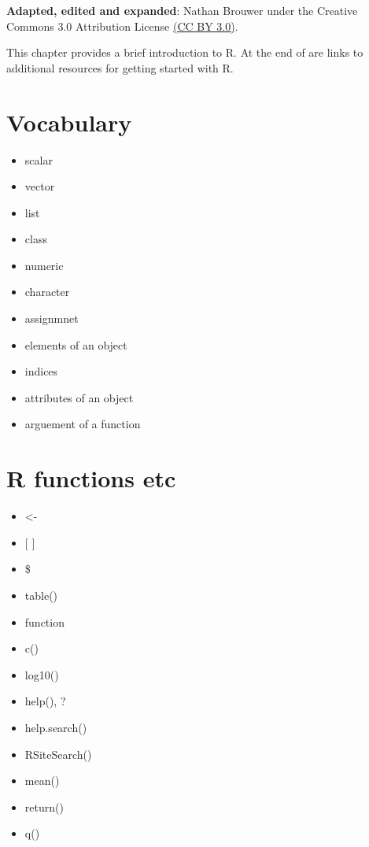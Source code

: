 \documentclass[
]{book}
\providecommand{\tightlist}{%
  \setlength{\itemsep}{0pt}\setlength{\parskip}{0pt}}
\begin{document}
\textbf{Adapted, edited and expanded}: Nathan Brouwer under the Creative Commons 3.0 Attribution License \href{https://creativecommons.org/licenses/by/3.0/}{(CC BY 3.0)}.

This chapter provides a brief introduction to R. At the end of are links to additional resources for getting started with R.

\hypertarget{vocabulary}{%
\section{Vocabulary}\label{vocabulary}}

\begin{itemize}
\tightlist
\item
  scalar
\item
  vector
\item
  list
\item
  class
\item
  numeric
\item
  character
\item
  assignmnet
\item
  elements of an object
\item
  indices
\item
  attributes of an object
\item
  arguement of a function
\end{itemize}

\hypertarget{r-functions-etc}{%
\section{R functions etc}\label{r-functions-etc}}

\begin{itemize}
\tightlist
\item
  \textless-
\item
  {[} {]}
\item
  \$
\item
  table()
\item
  function
\item
  c()
\item
  log10()
\item
  help(), ?
\item
  help.search()
\item
  RSiteSearch()
\item
  mean()
\item
  return()
\item
  q()
\end{itemize}
\end{document}
